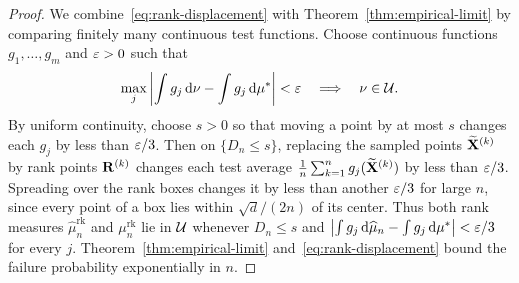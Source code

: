 \documentclass[11pt,letterpaper]{article}
\begin{document}
\begin{proof}
            We combine~\eqref{eq:rank-displacement} with Theorem~\ref{thm:empirical-limit} by comparing finitely many continuous test functions. Choose continuous functions $g_1,\ldots,g_m$ and $\varepsilon>0$ such that
            \[
                  \max_j\left|\int g_j\,\mathrm d\nu-\int g_j\,\mathrm d\mu^\ast\right|<\varepsilon
                  \quad\Longrightarrow\quad\nu\in\mathcal U.
            \]
            By uniform continuity, choose $s>0$ so that moving a point by at most $s$ changes each $g_j$ by less than $\varepsilon/3$. Then on $\{D_n\le s\}$, replacing the sampled points $\widetilde{\mathbf X}^{(k)}$ by rank points $\mathbf R^{(k)}$ changes each test average
            $\frac{1}{n}\sum_{k=1}^{n}g_{j}(\widetilde{\mathbf X}^{(k)})$
            by less than $\varepsilon/3$. Spreading over the rank boxes changes it by less than another $\varepsilon/3$ for large $n$, since every point of a box lies within $\sqrt d/(2n)$ of its center. Thus both rank measures $\widehat\mu_n^{\mathrm{rk}}$ and $\mu_n^{\mathrm{rk}}$ lie in $\mathcal U$ whenever $D_n\le s$ and $\left|\int g_j\,\mathrm d\widehat\mu_n-\int g_j\,\mathrm d\mu^\ast\right|<\varepsilon/3$ for every $j$. Theorem~\ref{thm:empirical-limit} and~\eqref{eq:rank-displacement} bound the failure probability exponentially in $n$.
      \end{proof}

\end{document}
